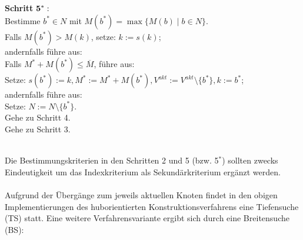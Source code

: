 \noindent \textbf{Schritt} $\bf{5^*:}$\\
\phantom \quad Bestimme $b^* \in N$ mit $M(b^*) = \max\{M(b) \mid b \in N\}$.\\
\phantom \quad Falls $M(b^*) > M(k)$, setze: $k := s(k)$;\\
\phantom \quad andernfalls führe aus:\\
\phantom \quad \qquad Falls $M^* + M(b^*) \leq \overline{M}$, führe aus:\\
\phantom \quad \qquad \qquad Setze: $s(b^*) := k, M^* := M^* + M(b^*), V^{akt} := V^{akt} \setminus \{b^*\}, k := b^*$;\\
\phantom \quad \qquad andernfalls führe aus:\\
\phantom \quad \qquad \qquad Setze: $N := N \setminus \{b^*\}$.\\
\phantom \quad \qquad \qquad Gehe zu Schritt 4.\\
\phantom \quad Gehe zu Schritt 3.

\phantom \\
\noindent Die Bestimmungskriterien in den Schritten 2 und 5 (bzw. 5$^*$) sollten zwecks Eindeutigkeit um das Indexkriterium als Sekundärkriterium ergänzt werden.\\
\\
Aufgrund der Übergänge zum jeweils aktuellen Knoten findet in den obigen Implementierungen des huborientierten Konstruktionsverfahrens eine Tiefensuche (TS) statt. Eine weitere Verfahrensvariante ergibt sich durch eine Breitensuche (BS):
\\


